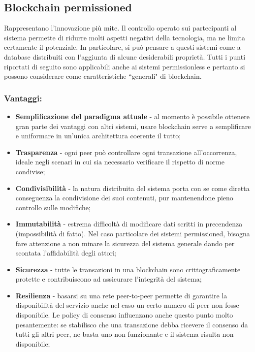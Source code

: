	\subsection{Blockchain permissioned}
		Rappresentano l'innovazione più mite. Il controllo operato sui partecipanti al sistema permette di ridurre molti aspetti negativi della tecnologia, ma ne limita certamente il potenziale. In particolare, si può pensare a questi sistemi come a database distribuiti con l'aggiunta di alcune desiderabili proprietà. Tutti i punti riportati di seguito sono applicabili anche ai sistemi permissionless e pertanto si possono considerare come caratteristiche ``generali" di blockchain.
		\subsubsection{Vantaggi:}
			\begin{itemize}
				\item \textbf{Semplificazione del paradigma attuale} - al momento è possibile ottenere gran parte dei vantaggi con altri sistemi, usare blockchain serve a semplificare e uniformare in un'unica architettura coerente il tutto;
				\item \textbf{Trasparenza} - ogni peer può controllare ogni transazione all'occorrenza, ideale negli scenari in cui sia necessario verificare il rispetto di norme condivise;
				\item \textbf{Condivisibilità} - la natura distribuita del sistema porta con se come diretta conseguenza la condivisione dei suoi contenuti, pur mantenendone pieno controllo sulle modifiche;
				\item \textbf{Immutabilità} - estrema difficoltà di modificare dati scritti in precendenza (impossibilità di fatto). Nel caso particolare dei sistemi permissioned, bisogna fare attenzione a non minare la sicurezza del sistema generale dando per scontata l'affidabilità degli attori;
				\item \textbf{Sicurezza} - tutte le transazioni in una blockchain sono crittograficamente protette e contribuiscono ad assicurare l'integrità del sistema;
				\item \textbf{Resilienza} - basarsi su una rete peer-to-peer permette di garantire la disponibilità del servizio anche nel caso un certo numero di peer non fosse disponibile. Le policy di consenso influenzano anche questo punto molto pesantemente: se stabilisco che una transazione debba ricevere il consenso da tutti gli altri peer, ne basta uno non funzionante e il sistema risulta non disponibile;
			\end{itemize}
